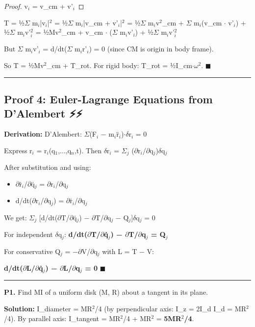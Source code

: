 \documentclass[12pt,a4paper,openany]{book}
\begin{document}
{{\begin{proof}

v$_i$ = v_cm + v'$_i$
\end{proof}

T = ½$\Sigma$ m$_i$|v$_i$|$^2$ = ½$\Sigma$ m$_i$|v_cm + v'$_i$|$^2$
= ½$\Sigma$ m$_i$v$^2$_cm + $\Sigma$ m$_i$(v_cm $\cdot$ v'$_i$) + ½$\Sigma$ m$_i$v'$_i^2$
= ½Mv$^2$_cm + v_cm $\cdot$ ($\Sigma$ m$_i$v'$_i$) + ½$\Sigma$ m$_i$v'$_i^2$

But $\Sigma$ m$_i$v'$_i$ = d/dt($\Sigma$ m$_i$r'$_i$) = 0 (since CM is origin in body frame).

So T = ½Mv$^2$_cm + T_rot. For rigid body: T_rot = ½I_cm$\cdot\omega^2$. $\blacksquare$

\bigskip\noindent\rule{\textwidth}{0.4pt}\bigskip

\subsection{Proof 4: Euler-Lagrange Equations from D'Alembert ⚡⚡}

\textbf{Derivation:}
D'Alembert: $\Sigma$(F$_i$ − m$_i$r̈$_i$)$\cdot\delta$r$_i$ = 0

Express r$_i$ = r$_i$(q$_1$,...,q$_n$,t). Then $\delta$r$_i$ = $\Sigma_j$ ($\partial$r$_i$/$\partial$q$_j$)$\delta$q$_j$

After substitution and using:
\begin{itemize}[leftmargin=*]
  \item $\partial$ṙ$_i$/$\partial$q̇$_j$ = $\partial$r$_i$/$\partial$q$_j$
  \item d/dt($\partial$r$_i$/$\partial$q$_j$) = $\partial$ṙ$_i$/$\partial$q$_j$
\end{itemize}

We get: $\Sigma_j$ [d/dt($\partial$T/$\partial$q̇$_j$) − $\partial$T/$\partial$q$_j$ − Q$_j$]$\delta$q$_j$ = 0

For independent $\delta$q$_j$: \textbf{d/dt($\partial$T/$\partial$q̇$_j$) − $\partial$T/$\partial$q$_j$ = Q$_j$}

For conservative Q$_j$ = −$\partial$V/$\partial$q$_j$ with L = T − V:

\textbf{d/dt($\partial$L/$\partial$q̇$_j$) − $\partial$L/$\partial$q$_j$ = 0} $\blacksquare$

\bigskip\noindent\rule{\textwidth}{0.4pt}\bigskip


\textbf{P1.} Find MI of a uniform disk (M, R) about a tangent in its plane.

\textbf{Solution:} I_diameter = MR$^2$/4 (by perpendicular axis: I_z = 2I_d  I_d = MR$^2$/4).
By parallel axis: I_tangent = MR$^2$/4 + MR$^2$ = \textbf{5MR$^2$/4}.

}}
\end{document}
